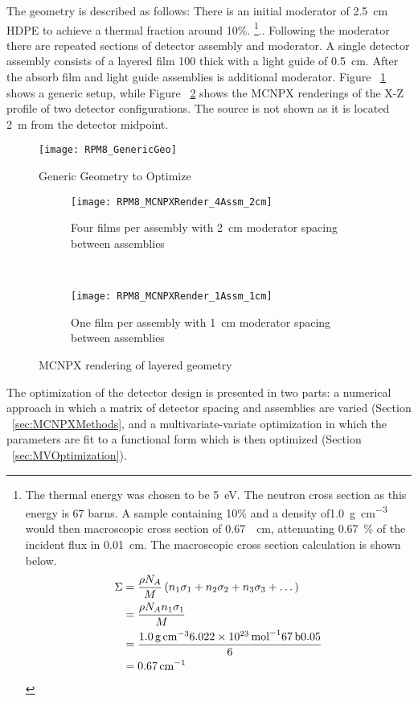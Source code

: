 The geometry is described as follows:
There is an initial moderator of \SI{2.5}{\centi \meter} HDPE to achieve a thermal fraction around 10\%.
\footnote{The thermal energy was chosen to be \SI{5}{\electronvolt}. 
The  neutron cross section as this energy is 67 barns. 
A sample containing 10\%  and a density of\SI{1.0}{\gram \per \cubic \centi\meter} would then macroscopic cross section of \SI{0.67}{\per \centi\meter}, attenuating \SI{0.67}{\percent} of the incident flux in \SI{0.01}{ \centi\meter}. 
The macroscopic cross section calculation is shown below. 
\begin{align*}
\Sigma &= \frac{\rho N_A}{M}  \left ( n_1 \sigma_1 + n_2 \sigma_2 + n_3 \sigma_3 + \dots  \right ) \\ 
       &= \frac{\rho N_A n_1 \sigma_1}{M} \\
       &= \frac{\SI{1.0}{\gram\per\cubic\centi\meter} \SI{6.022E23}{\per\mole} \SI{67}{\barn}{0.05}}{6} \\
       &= \SI{0.67}{\per\centi\meter} 
\end{align*}
}..
Following the moderator there are repeated sections of detector assembly and moderator.
A single detector assembly consists of a layered film \SI{100}{\micron} thick with a light guide of \SI{0.5}{\centi\meter}.
After the absorb film and light guide assemblies is additional moderator.
Figure ~\ref{fig:GenericDetector} shows a generic setup, while Figure ~\ref{fig:MCNPXRendering} shows the MCNPX renderings of the X-Z profile of two detector configurations.
The source is not shown as it is located \SI{2}{\meter} from the detector midpoint.
\begin{figure}
   \centering
	 \texttt{[image: RPM8\_GenericGeo]}
   \caption{Generic Geometry to Optimize}
   \label{fig:GenericDetector}
\end{figure}

\begin{figure}
    \centering
    \begin{subfigure}[b]{0.45\textwidth}
        \texttt{[image: RPM8\_MCNPXRender\_4Assm\_2cm]}
        \caption{Four films per assembly with \SI{2}{\centi\meter} moderator spacing between assemblies}
    \end{subfigure}%
    ~
    \begin{subfigure}[b]{0.45\textwidth}
        \texttt{[image: RPM8\_MCNPXRender\_1Assm\_1cm]}
        \caption{One film per assembly with \SI{1}{\centi\meter} moderator spacing between assemblies}
    \end{subfigure}
    \caption{MCNPX rendering of layered geometry}
    \label{fig:MCNPXRendering}
\end{figure}
The optimization of the detector design is presented in two parts: a numerical approach in which a matrix of detector spacing and assemblies are varied (Section ~\ref{sec:MCNPXMethods}, and a multivariate-variate optimization in which the parameters are fit to a functional form which is then optimized (Section ~\ref{sec:MVOptimization}).
